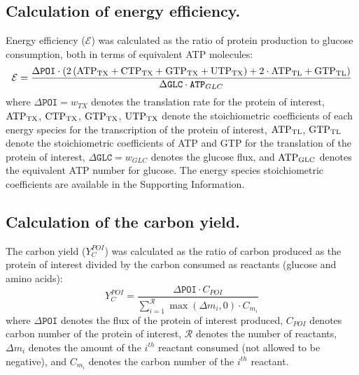 \documentclass[journal=asbcd6,manuscript=article]{achemso}
\begin{document}
\subsection*{Calculation of energy efficiency.}
Energy efficiency ($\mathcal{E}$) was calculated as the ratio of protein production to glucose consumption, both in terms of equivalent ATP molecules:
\begin{equation}\label{eqn:energy-efficiency-definition}
	\mathcal{E}=\frac{\Delta\texttt{POI}\cdot \left(2\left(\rm {ATP}_{TX}+\rm {CTP}_{TX}+\rm {GTP}_{TX}+\rm {UTP}_{TX}\right)+\rm2\cdot\rm {ATP}_{TL}+\rm {GTP}_{TL}\right)}{\Delta\texttt{GLC}\cdot\texttt{ATP}_{GLC}}
\end{equation}
where $\Delta\texttt{POI}=w_{TX}$ denotes the translation rate for the protein of interest, $\rm {ATP}_{TX}$, $\rm {CTP}_{TX}$, $\rm {GTP}_{TX}$, $\rm {UTP}_{TX}$ denote the stoichiometric coefficients of each energy species for the transcription of the protein of interest, $\rm {ATP}_{TL}$, $\rm {GTP}_{TL}$ denote the stoichiometric coefficients of ATP and GTP for the translation of the protein of interest, $\Delta\texttt{GLC}=w_{GLC}$ denotes the glucose flux, and $\rm {ATP}_{GLC}$ denotes the equivalent ATP number for glucose.
The energy species stoichiometric coefficients are available in the Supporting Information.

\subsection*{Calculation of the carbon yield.}
The carbon yield ($Y_{C}^{POI}$) was calculated as the ratio of carbon produced as the protein of interest divided by the carbon consumed as reactants (glucose and amino acids):
\begin{equation}\label{eqn:yield-definition}
	Y_{C}^{POI}=\frac{\Delta\texttt{POI}\cdot C_{POI}}{\displaystyle\sum_{i=1}^{\mathcal{R}}\max(\Delta m_{i},0)\cdot C_{m_i}}
\end{equation}
where $\Delta\texttt{POI}$ denotes the flux of the protein of interest produced, $C_{POI}$ denotes carbon number of the protein of interest, $\mathcal{R}$ denotes the number of reactants,
$\Delta m_{i}$ denotes the amount of the $i^{th}$ reactant consumed (not allowed to be negative), and $C_{m_i}$ denotes the carbon number of the $i^{th}$ reactant.
\end{document}
